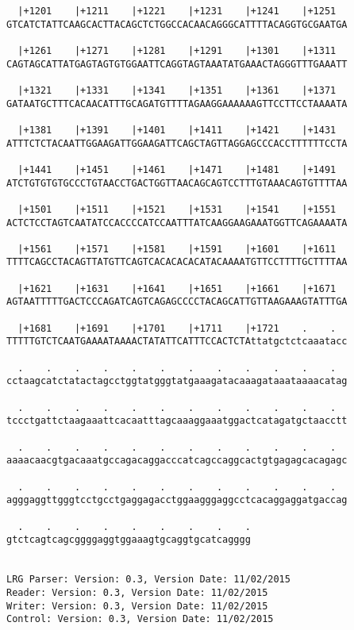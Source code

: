 \documentclass{article}
\begin{document}
\begin{Verbatim}
  |+1201    |+1211    |+1221    |+1231    |+1241    |+1251  
GTCATCTATTCAAGCACTTACAGCTCTGGCCACAACAGGGCATTTTACAGGTGCGAATGA
                                                            
  |+1261    |+1271    |+1281    |+1291    |+1301    |+1311  
CAGTAGCATTATGAGTAGTGTGGAATTCAGGTAGTAAATATGAAACTAGGGTTTGAAATT
                                                            
  |+1321    |+1331    |+1341    |+1351    |+1361    |+1371  
GATAATGCTTTCACAACATTTGCAGATGTTTTAGAAGGAAAAAAGTTCCTTCCTAAAATA
                                                            
  |+1381    |+1391    |+1401    |+1411    |+1421    |+1431  
ATTTCTCTACAATTGGAAGATTGGAAGATTCAGCTAGTTAGGAGCCCACCTTTTTTCCTA
                                                            
  |+1441    |+1451    |+1461    |+1471    |+1481    |+1491  
ATCTGTGTGTGCCCTGTAACCTGACTGGTTAACAGCAGTCCTTTGTAAACAGTGTTTTAA
                                                            
  |+1501    |+1511    |+1521    |+1531    |+1541    |+1551  
ACTCTCCTAGTCAATATCCACCCCATCCAATTTATCAAGGAAGAAATGGTTCAGAAAATA
                                                            
  |+1561    |+1571    |+1581    |+1591    |+1601    |+1611  
TTTTCAGCCTACAGTTATGTTCAGTCACACACACATACAAAATGTTCCTTTTGCTTTTAA
                                                            
  |+1621    |+1631    |+1641    |+1651    |+1661    |+1671  
AGTAATTTTTGACTCCCAGATCAGTCAGAGCCCCTACAGCATTGTTAAGAAAGTATTTGA
                                                            
  |+1681    |+1691    |+1701    |+1711    |+1721    .    .  
TTTTTGTCTCAATGAAAATAAAACTATATTCATTTCCACTCTAttatgctctcaaatacc
                                                            
  .    .    .    .    .    .    .    .    .    .    .    .  
cctaagcatctatactagcctggtatgggtatgaaagatacaaagataaataaaacatag
                                                            
  .    .    .    .    .    .    .    .    .    .    .    .  
tccctgattctaagaaattcacaatttagcaaaggaaatggactcatagatgctaacctt
                                                            
  .    .    .    .    .    .    .    .    .    .    .    .  
aaaacaacgtgacaaatgccagacaggacccatcagccaggcactgtgagagcacagagc
                                                            
  .    .    .    .    .    .    .    .    .    .    .    .  
agggaggttgggtcctgcctgaggagacctggaagggaggcctcacaggaggatgaccag
                                                            
  .    .    .    .    .    .    .    .    .
gtctcagtcagcggggaggtggaaagtgcaggtgcatcagggg
                                           
                                           
LRG Parser: Version: 0.3, Version Date: 11/02/2015
Reader: Version: 0.3, Version Date: 11/02/2015
Writer: Version: 0.3, Version Date: 11/02/2015
Control: Version: 0.3, Version Date: 11/02/2015
\end{Verbatim}
\end{document}
